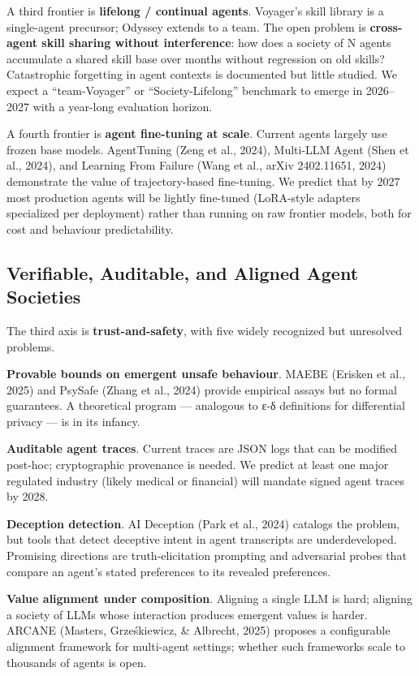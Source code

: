 A third frontier is \textbf{lifelong / continual agents}. Voyager's skill library is a single-agent precursor; Odyssey extends to a team. The open problem is \textbf{cross-agent skill sharing without interference}: how does a society of N agents accumulate a shared skill base over months without regression on old skills? Catastrophic forgetting in agent contexts is documented but little studied. We expect a ``team-Voyager'' or ``Society-Lifelong'' benchmark to emerge in 2026--2027 with a year-long evaluation horizon.

A fourth frontier is \textbf{agent fine-tuning at scale}. Current agents largely use frozen base models. AgentTuning (Zeng et al., 2024), Multi-LLM Agent (Shen et al., 2024), and Learning From Failure (Wang et al., arXiv 2402.11651, 2024) demonstrate the value of trajectory-based fine-tuning. We predict that by 2027 most production agents will be lightly fine-tuned (LoRA-style adapters specialized per deployment) rather than running on raw frontier models, both for cost and behaviour predictability.

\subsection{Verifiable, Auditable, and Aligned Agent Societies}\label{verifiable-auditable-and-aligned-agent-societies}

The third axis is \textbf{trust-and-safety}, with five widely recognized but unresolved problems.

\textbf{Provable bounds on emergent unsafe behaviour}. MAEBE (Erisken et al., 2025) and PsySafe (Zhang et al., 2024) provide empirical assays but no formal guarantees. A theoretical program --- analogous to ε-δ definitions for differential privacy --- is in its infancy.

\textbf{Auditable agent traces}. Current traces are JSON logs that can be modified post-hoc; cryptographic provenance is needed. We predict at least one major regulated industry (likely medical or financial) will mandate signed agent traces by 2028.

\textbf{Deception detection}. AI Deception (Park et al., 2024) catalogs the problem, but tools that detect deceptive intent in agent transcripts are underdeveloped. Promising directions are truth-elicitation prompting and adversarial probes that compare an agent's stated preferences to its revealed preferences.

\textbf{Value alignment under composition}. Aligning a single LLM is hard; aligning a society of LLMs whose interaction produces emergent values is harder. ARCANE (Masters, Grześkiewicz, \& Albrecht, 2025) proposes a configurable alignment framework for multi-agent settings; whether such frameworks scale to thousands of agents is open.

